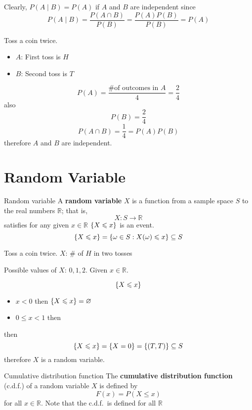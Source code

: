 Clearly, $ P(A\mid B)=P(A) $ if $ A $ and $ B $ are independent since
\[ P(A\mid B)=\frac{P(A\cap B)}{P(B)}=\frac{P(A)P(B)}{P(B)}=P(A)  \]

\begin{Example}{}{}
    Toss a coin twice.
    \begin{itemize}
        \item $ A $: First toss is $ H $
        \item $ B $: Second toss is $ T $
    \end{itemize}
    \[ P(A)=\frac{\text{\# of outcomes in }A}{4}=\frac{2}{4}  \]
    also
    \[ P(B)=\frac{2}{4} \]
    \[ P(A\cap B)=\frac{1}{4}=P(A)P(B) \]
    therefore $ A $ and $ B $ are independent.
\end{Example}

\section{Random Variable}

\begin{Definition}{Random variable}{}
    A \textbf{random variable} $ X $
    is a function from a sample space $ S $ to the real numbers $ \mathbb{R} $; that is,
    \[ X:S\to \mathbb{R} \] satisfies for any given $ x\in\mathbb{R} $
    $ \{X\leqslant x\} $ is an event.
    \[ \{X\leqslant x\}=\{\omega\in S:X(\omega)\leqslant x\}
        \subseteq S \]
\end{Definition}

\begin{Example}{}{}
    Toss a coin twice. $ X $: \# of $ H $ in two tosses

    Possible values of $ X $: $ 0,1,2 $. Given $ x\in\mathbb{R} $.

    \[ \{X\leqslant x\} \]
    \begin{itemize}
        \item $ x<0 $ then $ \{X\leqslant x\}= \varnothing $
        \item $ 0\leqslant x<1 $ then
    \end{itemize}
    then
    \[ \{X\leqslant x\}=\{X=0\}=\{(T,T)\}\subseteq S \]
    therefore $ X $ is a random variable.
\end{Example}

\begin{Definition}{Cumulative distribution function}{}
    The \textbf{cumulative distribution function} (c.d.f.) of a random variable
    $ X $ is defined by
    \[ F(x)=P(X\leqslant x) \]
    for all $ x\in\mathbb{R} $. Note that the c.d.f.\ is defined for all $ \mathbb{R} $
\end{Definition}

